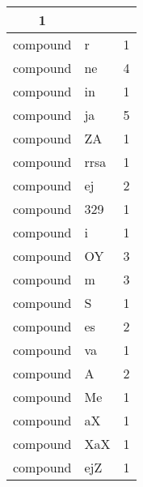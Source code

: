 \documentclass[a4 paper]{article}
\begin{document}
\begin{longtable}{cp{}p{}}
1\\ \midrule compound & r & 1\\ \midrule compound & ne & 4\\ \midrule compound & in & 1\\ \midrule compound & ja & 5\\ \midrule compound & ZA & 1\\ \midrule compound & rrsa & 1\\ \midrule compound & ej & 2\\ \midrule compound & 329 & 1\\ \midrule compound & i & 1\\ \midrule compound & OY & 3\\ \midrule compound & m & 3\\ \midrule compound & S & 1\\ \midrule compound & es & 2\\ \midrule compound & va & 1\\ \midrule compound & A & 2\\ \midrule compound & Me & 1\\ \midrule compound & aX & 1\\ \midrule compound & XaX & 1\\ \midrule compound & ejZ & 1\\ \midrule 

\end{longtable}
\end{document}
